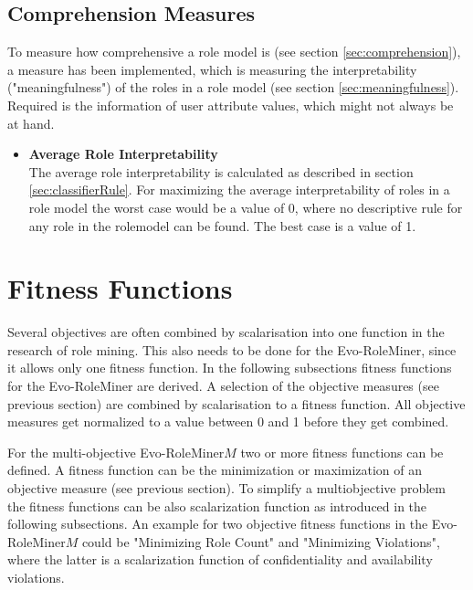     \subsection{Comprehension Measures}
    \label{sec:optimizationComprehension}
    To measure how comprehensive a role model is (see section \ref{sec:comprehension}), a measure has been implemented, which is measuring the interpretability ("meaningfulness") of the roles in a role model (see section \ref{sec:meaningfulness}). Required is the information of user attribute values, which might not always be at hand.
    
    \begin{itemize}
    	\item \textbf{Average Role Interpretability}\\
    	The average role interpretability is calculated as described in section \ref{sec:classifierRule}.
    	For maximizing the average interpretability of roles in a role model the worst case would be a value of 0, where no descriptive rule for any role in the rolemodel can be found. The best case is a value of 1.
    \end{itemize}
        
    \section{Fitness Functions}        
    Several objectives are often combined by scalarisation into one function in the research of role mining. This also needs to be done for the Evo-RoleMiner, since it allows only one fitness function. In the following subsections fitness functions for the Evo-RoleMiner are derived. A selection of the objective measures (see previous section) are combined by scalarisation to a fitness function. All objective measures get normalized to a value between 0 and 1 before they get combined.
    
    For the multi-objective Evo-RoleMiner$M$ two or more fitness functions can be defined. A fitness function can be the minimization or maximization of an objective measure (see previous section). To simplify a multiobjective problem the fitness functions can be also scalarization function as introduced in the following subsections. An example for two objective fitness functions in the Evo-RoleMiner$M$ could be "Minimizing Role Count" and "Minimizing Violations", where the latter is a scalarization function of confidentiality and availability violations.
        
